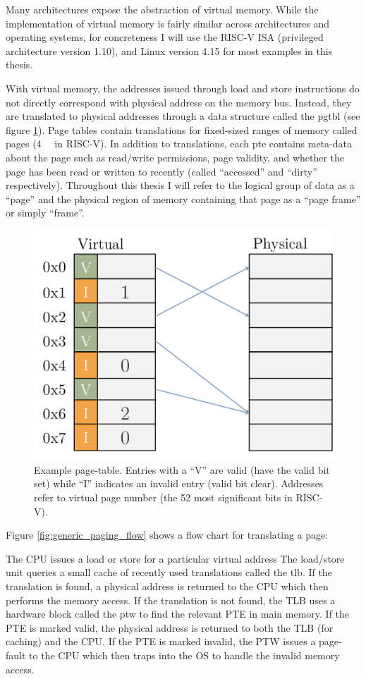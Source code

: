 Many architectures expose the abstraction of virtual memory. While the
implementation of virtual memory is fairly similar across architectures and
operating systems, for concreteness I will use the RISC-V ISA (privileged
architecture version 1.10\cite{riscv_priv110}), and Linux version
4.15\cite{linux} for most examples in this thesis.

With virtual memory, the addresses issued through load and store instructions
do not directly correspond with physical address on the memory bus. Instead,
they are translated to physical addresses through a data structure called the
\gls{pgtbl} (see figure \ref{fig:generic_paging}).  Page tables contain
translations for fixed-sized ranges of memory called \glspl{page} (\SI{4}{\kibi\byte}
in RISC-V). In addition to translations, each \gls{pte} contains meta-data about the page such as read/write permissions, page
validity, and whether the page has been read or written to recently (called
``accessed'' and ``dirty'' respectively). Throughout this thesis I will refer to
the logical group of data as a ``page'' and the physical region of memory
containing that page as a ``page frame'' or simply ``frame''.  

\begin{figure}[h]
    \centering
    \includegraphics[width=0.5\columnwidth]{figs/generic_page_table.pdf}
    \vspace{-5mm}
    \caption{Example page-table. Entries with a ``V'' are valid (have the valid
             bit set) while ``I'' indicates an invalid entry (valid bit clear).
           Addresses refer to virtual page number (the 52 most significant bits
         in RISC-V).}
    \label{fig:generic_paging}
\end{figure}

Figure \ref{fig:generic_paging_flow} shows a flow chart for translating a page:

\begin{outline}[enumerate]
  \1 The CPU issues a load or store for a particular virtual address
  \1 The load/store unit queries a small cache of recently used translations
  called the \gls{tlb}.
    \2 If the translation is found, a physical address is returned to the CPU
    which then performs the memory access.
  \1 If the translation is not found, the TLB uses a hardware block called the
  \gls{ptw} to find the relevant PTE in main memory.
    \2 If the PTE is marked valid, the physical address is returned to both the
    TLB (for caching) and the CPU.
  \1 If the PTE is marked invalid, the PTW issues a page-fault to the CPU which
  then traps into the OS to handle the invalid memory access.
\end{outline}

